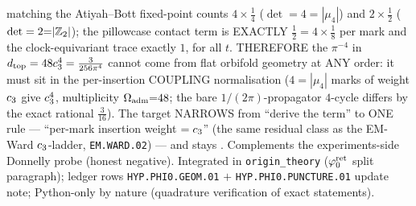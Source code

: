 \begin{itemize}[leftmargin=1.5em]
matching the Atiyah--Bott fixed-point counts $4{\times}\tfrac14$ ($\det=4{=}|\mu_4|$) and
$2{\times}\tfrac12$ ($\det=2{=}|\mathbb{Z}_2|$); the pillowcase contact term is EXACTLY $\tfrac12=4\times\tfrac18$
per mark and the clock-equivariant trace exactly $1$, for all $t$. THEREFORE the $\pi^{-4}$ in
$d_{\mathrm{top}}=48c_3^4=\tfrac{3}{256\pi^4}$ cannot come from flat orbifold geometry at ANY order:
it must sit in the per-insertion COUPLING normalisation ($4{=}|\mu_4|$ marks of weight $c_3$ give
$c_3^4$, multiplicity $\Omega_{\mathrm{adm}}{=}48$; the bare $1/(2\pi)$-propagator $4$-cycle differs by the exact
rational $\tfrac{3}{16}$). The target NARROWS from ``derive the term'' to ONE rule --- ``per-mark
insertion weight $=c_3$'' (the same residual class as the EM-Ward $c_3$-ladder,
\texttt{EM.WARD.02}) --- and stays \mO. Complements the experiments-side Donnelly probe (honest
negative). Integrated in \texttt{origin\_theory} ($\varphi_0^{\mathrm{ret}}$ split paragraph); ledger rows
\texttt{HYP.PHI0.GEOM.01} $+$ \texttt{HYP.PHI0.PUNCTURE.01} update note; Python-only by nature
(quadrature verification of exact statements).
\end{itemize}

